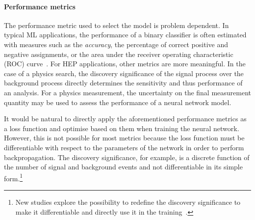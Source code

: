 \paragraph{Performance metrics}

The performance metric used to select the model is problem dependent.
In typical ML applications, the performance of a binary classifier is often estimated with measures such as the \emph{accuracy}, the percentage of correct positive and negative assignments, or the area under the receiver operating characteristic (ROC) curve~\cite{BRADLEY19971145}. 
For HEP applications, other metrics are more meaningful. In the case of a physics search, the discovery significance of the signal process over the background process directly determines the sensitivity and thus performance of an analysis. 
For a physics measurement, the uncertainty on the final measurement quantity may be used to assess the performance of a neural network model.

It would be natural to directly apply the aforementioned performance metrics as a loss function and optimise based on them when training the neural network.
However, this is not possible for most metrics because the loss function must be differentiable with respect to the parameters of the network in order to perform backpropagation. The discovery significance, for example, is a discrete function of the number of signal and background events and not differentiable in its simple form.\footnote{New studies explore the possibility to redefine the discovery significance to make it differentiable and directly use it in the training~\cite{ELWOODZ0INML}.}

